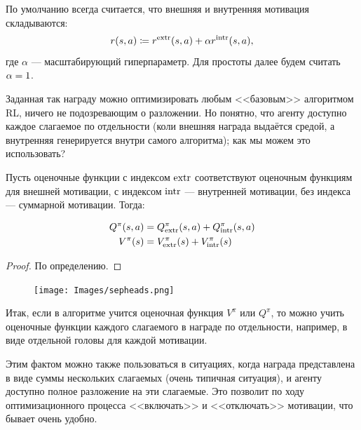 По умолчанию всегда считается, что внешняя и внутренняя мотивация складываются:
\begin{equation}\label{sumgoal}
r(s, a) \coloneqq r^{\mathrm{extr}}(s, a) + \alpha r^{\mathrm{intr}}(s, a),
\end{equation}
где $\alpha$ --- масштабирующий гиперпараметр. Для простоты далее будем считать $\alpha \HM= 1$.

Заданная так награду можно оптимизировать любым <<базовым>> алгоритмом RL, ничего не подозревающим о разложении. Но понятно, что агенту доступно каждое слагаемое по отдельности (коли внешняя награда выдаётся средой, а внутренняя генерируется внутри самого алгоритма); как мы можем это использовать?

Пусть оценочные функции с индексом $\mathrm{extr}$ соответствуют оценочным функциям для внешней мотивации, с индексом $\mathrm{intr}$ --- внутренней мотивации, без индекса --- суммарной мотивации. Тогда:
\begin{proposition}
\begin{equation}\label{valuefunctionssum}
\begin{aligned}
Q^\pi(s, a) &= Q^\pi_{\mathrm{extr}}(s, a) + Q^\pi_{\mathrm{intr}}(s, a) \\
V^\pi(s) &= V^\pi_{\mathrm{extr}}(s) + V^\pi_{\mathrm{intr}}(s)
\end{aligned}
\end{equation}
\begin{proof}
По определению.
\end{proof}
\end{proposition}

\begin{figure}
\centering
\texttt{[image: Images/sepheads.png]}
\end{figure}

Итак, если в алгоритме учится оценочная функция $V^\pi$ или $Q^\pi$, то можно учить оценочные функции каждого слагаемого в награде по отдельности, например, в виде отдельной головы для каждой мотивации. 

\begin{remark}
Этим фактом можно также пользоваться в ситуациях, когда награда представлена в виде суммы нескольких слагаемых (очень типичная ситуация), и агенту доступно полное разложение на эти слагаемые. Это позволит по ходу оптимизационного процесса <<включать>> и <<отключать>> мотивации, что бывает очень удобно.
\end{remark}


